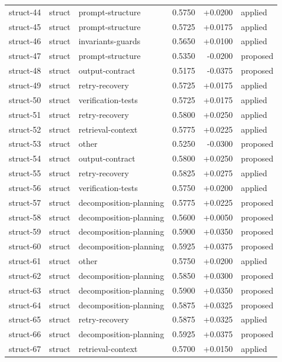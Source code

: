 \begin{center}
\begin{longtable}{llp{5.2cm}rrl}
struct-44 & struct & prompt-structure & 0.5750 & +0.0200 & applied \\
struct-45 & struct & prompt-structure & 0.5725 & +0.0175 & applied \\
struct-46 & struct & invariants-guards & 0.5650 & +0.0100 & applied \\
struct-47 & struct & prompt-structure & 0.5350 & -0.0200 & proposed \\
struct-48 & struct & output-contract & 0.5175 & -0.0375 & proposed \\
struct-49 & struct & retry-recovery & 0.5725 & +0.0175 & applied \\
struct-50 & struct & verification-tests & 0.5725 & +0.0175 & applied \\
struct-51 & struct & retry-recovery & 0.5800 & +0.0250 & applied \\
struct-52 & struct & retrieval-context & 0.5775 & +0.0225 & applied \\
struct-53 & struct & other & 0.5250 & -0.0300 & proposed \\
struct-54 & struct & output-contract & 0.5800 & +0.0250 & proposed \\
struct-55 & struct & retry-recovery & 0.5825 & +0.0275 & applied \\
struct-56 & struct & verification-tests & 0.5750 & +0.0200 & applied \\
struct-57 & struct & decomposition-planning & 0.5775 & +0.0225 & proposed \\
struct-58 & struct & decomposition-planning & 0.5600 & +0.0050 & proposed \\
struct-59 & struct & decomposition-planning & 0.5900 & +0.0350 & proposed \\
struct-60 & struct & decomposition-planning & 0.5925 & +0.0375 & proposed \\
struct-61 & struct & other & 0.5750 & +0.0200 & applied \\
struct-62 & struct & decomposition-planning & 0.5850 & +0.0300 & proposed \\
struct-63 & struct & decomposition-planning & 0.5900 & +0.0350 & proposed \\
struct-64 & struct & decomposition-planning & 0.5875 & +0.0325 & proposed \\
struct-65 & struct & retry-recovery & 0.5875 & +0.0325 & applied \\
struct-66 & struct & decomposition-planning & 0.5925 & +0.0375 & proposed \\
struct-67 & struct & retrieval-context & 0.5700 & +0.0150 & applied \\

\end{longtable}
\end{center}
